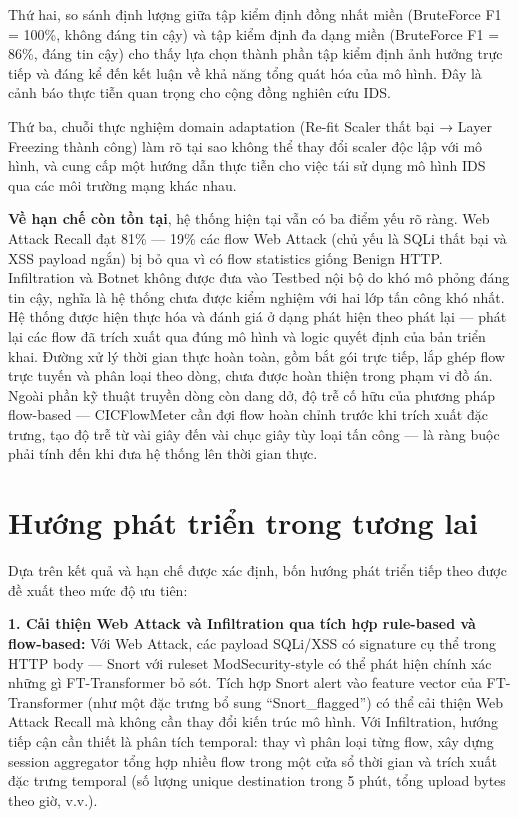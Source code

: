 \documentclass[../DoAn.tex]{subfiles}
\begin{document}
Thứ hai, so sánh định lượng giữa tập kiểm định đồng nhất miền (BruteForce F1 = 100\%, không đáng tin cậy) và tập kiểm định đa dạng miền (BruteForce F1 = 86\%, đáng tin cậy) cho thấy lựa chọn thành phần tập kiểm định ảnh hưởng trực tiếp và đáng kể đến kết luận về khả năng tổng quát hóa của mô hình. Đây là cảnh báo thực tiễn quan trọng cho cộng đồng nghiên cứu IDS.

Thứ ba, chuỗi thực nghiệm domain adaptation (Re-fit Scaler thất bại → Layer Freezing thành công) làm rõ tại sao không thể thay đổi scaler độc lập với mô hình, và cung cấp một hướng dẫn thực tiễn cho việc tái sử dụng mô hình IDS qua các môi trường mạng khác nhau.

\textbf{Về hạn chế còn tồn tại}, hệ thống hiện tại vẫn có ba điểm yếu rõ ràng. Web Attack Recall đạt 81\% --- 19\% các flow Web Attack (chủ yếu là SQLi thất bại và XSS payload ngắn) bị bỏ qua vì có flow statistics giống Benign HTTP. Infiltration và Botnet không được đưa vào Testbed nội bộ do khó mô phỏng đáng tin cậy, nghĩa là hệ thống chưa được kiểm nghiệm với hai lớp tấn công khó nhất. Hệ thống được hiện thực hóa và đánh giá ở dạng phát hiện theo phát lại --- phát lại các flow đã trích xuất qua đúng mô hình và logic quyết định của bản triển khai. Đường xử lý thời gian thực hoàn toàn, gồm bắt gói trực tiếp, lắp ghép flow trực tuyến và phân loại theo dòng, chưa được hoàn thiện trong phạm vi đồ án. Ngoài phần kỹ thuật truyền dòng còn dang dở, độ trễ cố hữu của phương pháp flow-based --- CICFlowMeter cần đợi flow hoàn chỉnh trước khi trích xuất đặc trưng, tạo độ trễ từ vài giây đến vài chục giây tùy loại tấn công --- là ràng buộc phải tính đến khi đưa hệ thống lên thời gian thực.

\section*{Hướng phát triển trong tương lai}
\label{sec:kl-tuonglai}

Dựa trên kết quả và hạn chế được xác định, bốn hướng phát triển tiếp theo được đề xuất theo mức độ ưu tiên:

\textbf{1. Cải thiện Web Attack và Infiltration qua tích hợp rule-based và flow-based:} Với Web Attack, các payload SQLi/XSS có signature cụ thể trong HTTP body --- Snort với ruleset ModSecurity-style có thể phát hiện chính xác những gì FT-Transformer bỏ sót. Tích hợp Snort alert vào feature vector của FT-Transformer (như một đặc trưng bổ sung ``Snort\_flagged'') có thể cải thiện Web Attack Recall mà không cần thay đổi kiến trúc mô hình. Với Infiltration, hướng tiếp cận cần thiết là phân tích temporal: thay vì phân loại từng flow, xây dựng session aggregator tổng hợp nhiều flow trong một cửa sổ thời gian và trích xuất đặc trưng temporal (số lượng unique destination trong 5 phút, tổng upload bytes theo giờ, v.v.).
\end{document}
